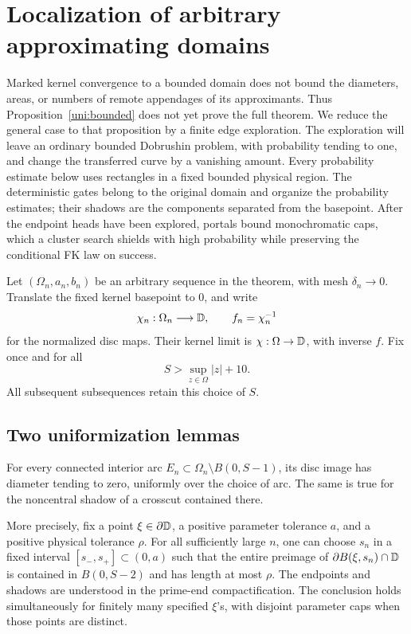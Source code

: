 \section{Localization of arbitrary approximating domains}
\label{loc:section}
\label{sec:localization}

Marked kernel convergence to a bounded domain does not bound the
diameters, areas, or numbers of remote appendages of its
approximants. Thus Proposition~\ref{uni:bounded} does not yet prove
the full theorem. We reduce the general case to that proposition
by a finite edge exploration. The exploration will leave an
ordinary bounded Dobrushin problem, with probability tending to
one, and change the transferred curve by a vanishing amount.
Every probability estimate below uses rectangles in a fixed
bounded physical region. The deterministic gates belong to the original
domain and organize the probability estimates; their shadows are the
components separated from the basepoint. After the endpoint heads have
been explored, portals bound monochromatic caps, which a cluster search
shields with high probability while preserving the conditional FK law
on success.

Let \((\Omega_n,a_n,b_n)\) be an arbitrary sequence in the theorem,
with mesh \(\delta_n\to0\). Translate the fixed kernel
basepoint to \(0\), and write
\[
 \chi_n:\Omega_n\longrightarrow\mathbb D,\qquad
 f_n=\chi_n^{-1}
\]
for the normalized disc maps. Their kernel limit is
\(\chi:\Omega\to\mathbb D\), with inverse \(f\). Fix once and for all
\[
 S>\sup_{z\in\Omega}|z|+10.
\]
All subsequent subsequences retain this choice of \(S\).

\subsection{Two uniformization lemmas}

\begin{lemma}
\label{loc:remote}
For every connected interior arc \(E_n\subset\Omega_n\setminus
B(0,S-1)\), its disc image has diameter tending to zero,
uniformly over the choice of arc. The same is true for the
noncentral shadow of a crosscut contained there.

More precisely, fix a point \(\xi\in\partial\mathbb D\), a positive
parameter tolerance \(a\), and a positive physical tolerance
\(\rho\). For all sufficiently large \(n\), one can choose
\(s_n\) in a fixed interval \([s_-,s_+]\subset(0,a)\) such that
the entire preimage of
\(\partial B(\xi,s_n)\cap\mathbb D\) is contained in \(B(0,S-2)\)
and has length at most \(\rho\).
The endpoints and shadows are understood in the prime-end
compactification. The conclusion holds simultaneously for
finitely many specified \(\xi\)'s, with disjoint parameter caps
when those points are distinct.
\end{lemma}


